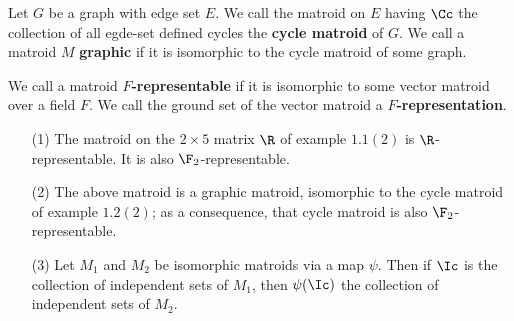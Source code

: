 \begin{definition}
    Let $G$ be a graph with edge set $E$. We call the matroid on $E$ having
    $\Cc$ the collection of all egde-set defined cycles the  \textbf{cycle
    matroid} of $G$. We call a matroid  $M$  \textbf{graphic} if it is
    isomorphic to the cycle matroid of some graph.
\end{definition}

\begin{definition}
    We call a matroid \textbf{$F$-representable} if it is isomorphic to some
    vector matroid over a field  $F$. We call the ground set of the vector
    matroid a \textbf{$F$-representation}.
\end{definition}

\begin{example}
    \begin{enumerate}
        \item[(1)] The matroid on the $2 \times 5$ matrix $\R$ of example
            $1.1(2)$ is $\R$-representable. It is also $\F_2$-representable.

        \item [(2)] The above matroid is a graphic matroid, isomorphic to the
            cycle matroid of example $1.2(2)$; as a consequence, that cycle
            matroid is also $\F_2$-representable.

        \item[(3)] Let $M_1$ and $M_2$ be isomorphic matroids via a map $\psi$.
            Then if  $\Ic$ is the collection of independent sets of $M_1$,
            then $\psi(\Ic)$ the collection of independent sets of $M_2$.
    \end{enumerate}
\end{example}

